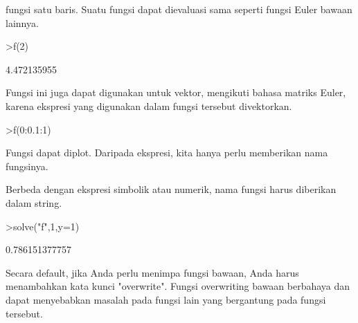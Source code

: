 \documentclass{article}
\begin{document}
\begin{eulernotebook}
\begin{eulercomment}
\begin{eulercomment}
\begin{eulercomment}
fungsi satu baris. Suatu fungsi dapat dievaluasi sama seperti fungsi
Euler bawaan lainnya.
\end{eulercomment}
\begin{eulerprompt}
>f(2)
\end{eulerprompt}
\begin{euleroutput}
  4.472135955
\end{euleroutput}
\begin{eulercomment}
Fungsi ini juga dapat digunakan untuk vektor, mengikuti bahasa matriks
Euler, karena ekspresi yang digunakan dalam fungsi tersebut
divektorkan.
\end{eulercomment}
\begin{eulerprompt}
>f(0:0.1:1)
\end{eulerprompt}
\begin{euleroutput}
  [0,  0.100499,  0.203961,  0.313209,  0.430813,  0.559017,  0.699714,
  0.854459,  1.0245,  1.21083,  1.41421]
\end{euleroutput}
\begin{eulercomment}
Fungsi dapat diplot. Daripada ekspresi, kita hanya perlu memberikan
nama fungsinya.

Berbeda dengan ekspresi simbolik atau numerik, nama fungsi harus
diberikan dalam string.
\end{eulercomment}
\begin{eulerprompt}
>solve("f",1,y=1)
\end{eulerprompt}
\begin{euleroutput}
  0.786151377757
\end{euleroutput}
\begin{eulercomment}
Secara default, jika Anda perlu menimpa fungsi bawaan, Anda harus
menambahkan kata kunci "overwrite". Fungsi overwriting bawaan
berbahaya dan dapat menyebabkan masalah pada fungsi lain yang
bergantung pada fungsi tersebut.


\end{eulercomment}
\end{eulercomment}
\end{eulercomment}
\end{eulernotebook}
\end{document}
